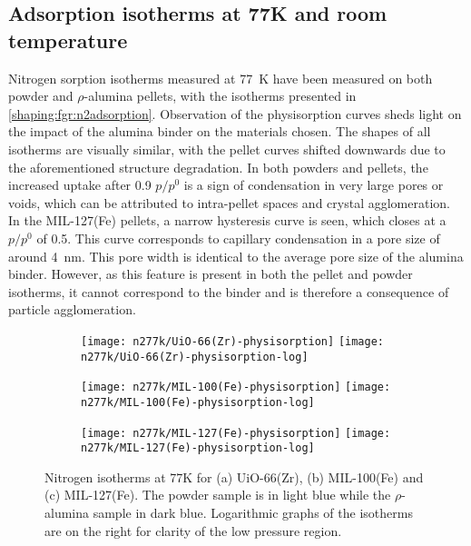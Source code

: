 
\subsection{Adsorption isotherms at 77K and room temperature}

Nitrogen sorption isotherms measured at \SI{77}{\kelvin} have been
measured on both powder and \(\rho\)-alumina pellets, with the isotherms
presented in \autoref{shaping:fgr:n2adsorption}.
Observation of the physisorption curves sheds light on the
impact of the alumina binder on the materials chosen.
The shapes of all isotherms are visually similar, with the pellet curves
shifted downwards due to the aforementioned structure degradation.
In both powders and pellets, the increased uptake after 0.9 \(p/p^0\)
is a sign of condensation in very large pores or voids, which can
be attributed to intra-pellet spaces and crystal agglomeration.
In the MIL-127(Fe) pellets, a narrow hysteresis curve is seen,
which closes at a \(p/p^0\) of 0.5. This curve corresponds to
capillary condensation in a pore size of around \SI{4}{\nano\metre}.
This pore width is identical to the average pore size of the alumina
binder. However, as this feature is present in both the pellet and 
powder isotherms, it cannot correspond to the binder and is therefore
a consequence of particle agglomeration.

\begin{figure}[p!]
	\centering

	\begin{subfigure}{\linewidth}
		\centering
		\parbox[c]{0.1\linewidth}{\caption{}\label{shaping:fgr:n277kuio66}}%
		\texttt{[image: n277k/UiO-66(Zr)-physisorption]}%
		\texttt{[image: n277k/UiO-66(Zr)-physisorption-log]}%
	\end{subfigure}%

	\begin{subfigure}{\linewidth}
		\centering
		\parbox[c]{0.1\linewidth}{\caption{}\label{shaping:fgr:n277kmil100}}%
		\texttt{[image: n277k/MIL-100(Fe)-physisorption]}%
		\texttt{[image: n277k/MIL-100(Fe)-physisorption-log]}%
	\end{subfigure}%

	\begin{subfigure}{\linewidth}
		\centering
		\parbox[c]{0.1\linewidth}{\caption{}\label{shaping:fgr:n277kmil127}}%
		\texttt{[image: n277k/MIL-127(Fe)-physisorption]}%
		\texttt{[image: n277k/MIL-127(Fe)-physisorption-log]}%
	\end{subfigure}%

	\caption{Nitrogen isotherms at 77K for (a) UiO-66(Zr),
		(b) MIL-100(Fe) and (c) MIL-127(Fe). The powder sample is in light
		blue while the \(\rho\)-alumina sample in dark blue. Logarithmic
		graphs of the isotherms are on the right for clarity of the low
		pressure region.}%
	\label{shaping:fgr:n2adsorption}
\end{figure}

